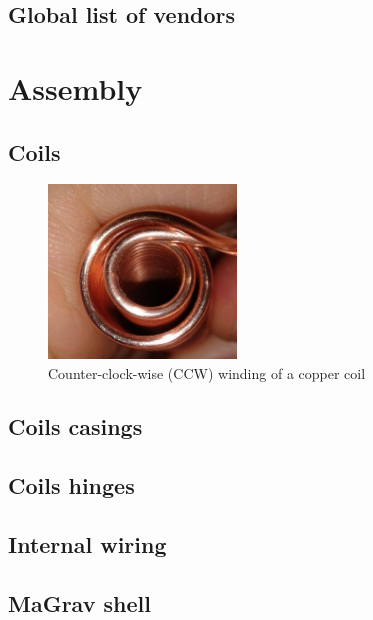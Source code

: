 \documentclass[
a4paper,     %
 headsepline, %
 footsepline, %
 titlepage,   %
 fleqn,       %
12pt         %
]{scrartcl}  %
\begin{document}
\subsection{Global list of vendors}
\label{sec:global-list-of-vendors}

\section{Assembly}
\label{sec:assembly}

\subsection{Coils}
\label{sec:coils}

\begin{figure}[h]
  \centering
  \includegraphics[width=50mm]{images/counter_clock_wise_winding.jpg}
  \caption[Counter-clock-wise (CCW) winding of a copper coil]{Counter-clock-wise (CCW) winding of a copper coil}
  \label{fig:ccw}
\end{figure}

\subsection{Coils casings}
\label{sec:coils-casings}

\subsection{Coils hinges}
\label{sec:coils-hinges}

\subsection{Internal wiring}
\label{sec:internal-wiring}

\subsection{MaGrav shell}
\label{sec:magrav-shell}
\end{document}
